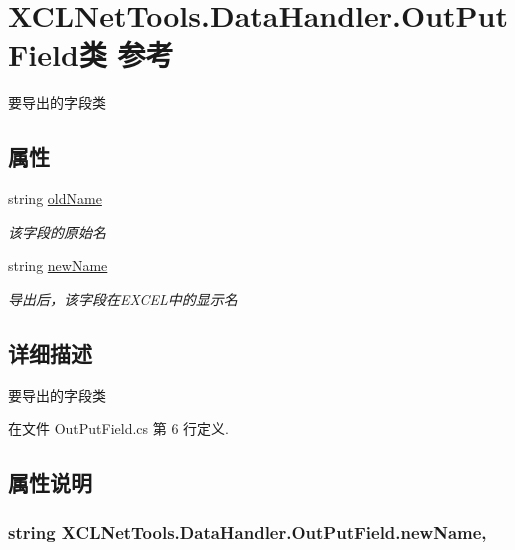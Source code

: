\hypertarget{class_x_c_l_net_tools_1_1_data_handler_1_1_out_put_field}{\section{X\-C\-L\-Net\-Tools.\-Data\-Handler.\-Out\-Put\-Field类 参考}
\label{class_x_c_l_net_tools_1_1_data_handler_1_1_out_put_field}
}


要导出的字段类  


\subsection*{属性}
\begin{DoxyCompactItemize}
\item 
string \hyperlink{class_x_c_l_net_tools_1_1_data_handler_1_1_out_put_field_a6d43eedd53c9281dec699a79d443c3b3}{old\-Name}
\begin{DoxyCompactList}\small\item\em 该字段的原始名 \end{DoxyCompactList}\item 
string \hyperlink{class_x_c_l_net_tools_1_1_data_handler_1_1_out_put_field_a6dad198f86f056470802a9323058f19c}{new\-Name}
\begin{DoxyCompactList}\small\item\em 导出后，该字段在\-E\-X\-C\-E\-L中的显示名 \end{DoxyCompactList}\end{DoxyCompactItemize}


\subsection{详细描述}
要导出的字段类 



在文件 Out\-Put\-Field.\-cs 第 6 行定义.



\subsection{属性说明}
\hypertarget{class_x_c_l_net_tools_1_1_data_handler_1_1_out_put_field_a6dad198f86f056470802a9323058f19c}{
\subsubsection[{new\-Name}]{\setlength{\rightskip}{0pt plus 5cm}string X\-C\-L\-Net\-Tools.\-Data\-Handler.\-Out\-Put\-Field.\-new\-Name\hspace{0.3cm}{\ttfamily [get]}, {\ttfamily [set]}}}\label{class_x_c_l_net_tools_1_1_data_handler_1_1_out_put_field_a6dad198f86f056470802a9323058f19c}


